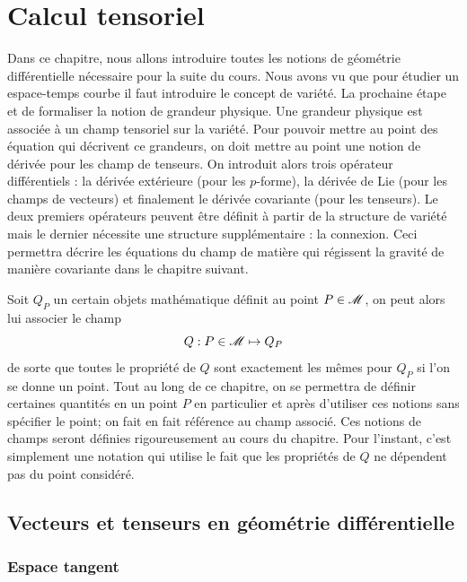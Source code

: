 \documentclass[a4paper,11pt]{report}
\begin{document}
\chapter{Calcul tensoriel}

    Dans ce chapitre, nous allons introduire toutes les notions de géométrie différentielle nécessaire pour la suite du cours. Nous avons vu que pour étudier un espace-temps courbe il faut introduire le concept de variété. La prochaine étape et de formaliser la notion de grandeur physique. Une grandeur physique est associée à un champ tensoriel sur la variété. Pour pouvoir mettre au point des équation qui décrivent ce grandeurs, on doit mettre au point une notion de dérivée pour les champ de tenseurs. On introduit alors trois opérateur différentiels : la dérivée extérieure (pour les $p$-forme), la dérivée de Lie (pour les champs de vecteurs) et finalement le dérivée covariante (pour les tenseurs). Le deux premiers opérateurs peuvent être définit à partir de la structure de variété mais le dernier nécessite une structure supplémentaire : la connexion. Ceci permettra décrire les équations du champ de matière qui régissent la gravité de manière covariante dans le chapitre suivant.
    
    \begin{rmk}
        Soit $Q_P$ un certain objets mathématique définit au point $P\in\mathscr{M}$, on peut alors lui associer le champ
        \begin{equation*}
            Q:P\in\mathscr{M}\mapsto Q_P
        \end{equation*}
        de sorte que toutes le propriété de $Q$ sont exactement les mêmes pour $Q_P$ si l'on se donne un point. Tout au long de ce chapitre, on se permettra de définir certaines quantités en un point $P$ en particulier et après d'utiliser ces notions sans spécifier le point; on fait en fait référence au champ associé. Ces notions de champs seront définies rigoureusement au cours du chapitre. Pour l'instant, c'est simplement une notation qui utilise le fait que les propriétés de $Q$ ne dépendent pas du point considéré.
    \end{rmk}
    
        \section{Vecteurs et tenseurs en géométrie différentielle}
        
            \subsection{Espace tangent}
                
\end{document}
